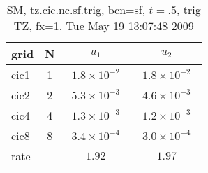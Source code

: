 \begin{table}[hbt]\tableFont %
\begin{center}
\begin{tabular}{|l|c|c|c|} \hline 
grid  & N &  $u_1$ & $u_2$  \\ \hline 
                cic1 &     1 & ~$1.8\times10^{ -2}$~ & ~$1.8\times10^{ -2}$~  \\ \hline
                cic2 &     2 & ~$5.3\times10^{ -3}$~ & ~$4.6\times10^{ -3}$~  \\ \hline
                cic4 &     4 & ~$1.3\times10^{ -3}$~ & ~$1.2\times10^{ -3}$~  \\ \hline
                cic8 &     8 & ~$3.4\times10^{ -4}$~ & ~$3.0\times10^{ -4}$~  \\ \hline
    rate             &       &       $1.92$          &       $1.97$           \\ \hline
\end{tabular}
\caption{SM, tz.cic.nc.sf.trig, bcn=sf, $t=.5$, trig TZ, fx=1, Tue May 19 13:07:48 2009}\label{table:tz.cic.nc.sf.trig}
\end{center}
\end{table}
